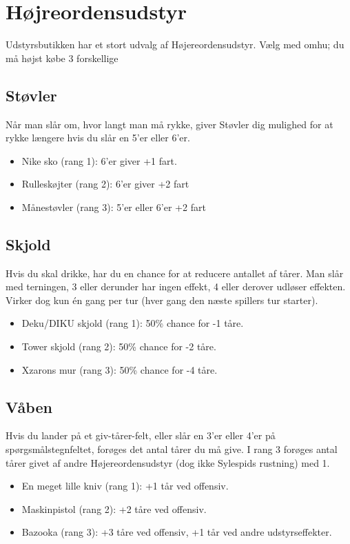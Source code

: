 \documentclass{article}
\begin{document}
\section{Højreordensudstyr}
Udstyrsbutikken har et stort udvalg af Højereordensudstyr. Vælg med omhu; du må højst købe 3  forskellige
 
\subsection{Støvler}
Når man slår om, hvor langt man må rykke, giver Støvler dig mulighed for at rykke længere hvis du slår en 5’er eller 6’er.

\begin{itemize}
	\item Nike sko (rang 1): 6'er giver +1 fart.
	\item Rulleskøjter (rang 2): 6'er giver +2 fart
	\item Månestøvler (rang 3): 5'er eller 6'er +2 fart
\end{itemize}
 
\subsection{Skjold}
Hvis du skal drikke, har du en chance for at reducere antallet af tårer. Man slår med terningen, 3 eller derunder har ingen effekt, 4 eller derover udløser effekten. Virker dog kun én gang per tur (hver gang den næste spillers tur starter).

\begin{itemize}
	\item Deku/DIKU skjold (rang 1): 50\% chance for -1 tåre.
	\item Tower skjold (rang 2): 50\% chance for -2 tåre.
	\item Xzarons mur (rang 3): 50\% chance for -4 tåre.
\end{itemize}
 
\subsection{Våben} Hvis du lander på et giv-tårer-felt, eller slår en 3’er eller 4’er på spørgsmålstegnfeltet, forøges det antal tårer du må give. I rang 3 forøges antal tårer givet af andre Højereordensudstyr (dog ikke Sylespids rustning) med 1.

\begin{itemize}
	\item En meget lille kniv (rang 1): +1 tår ved offensiv.
	\item Maskinpistol (rang 2): +2 tåre ved offensiv.
	\item Bazooka (rang 3): +3 tåre ved offensiv, +1 tår ved andre udstyrseffekter.
\end{itemize}
 
\end{document}
